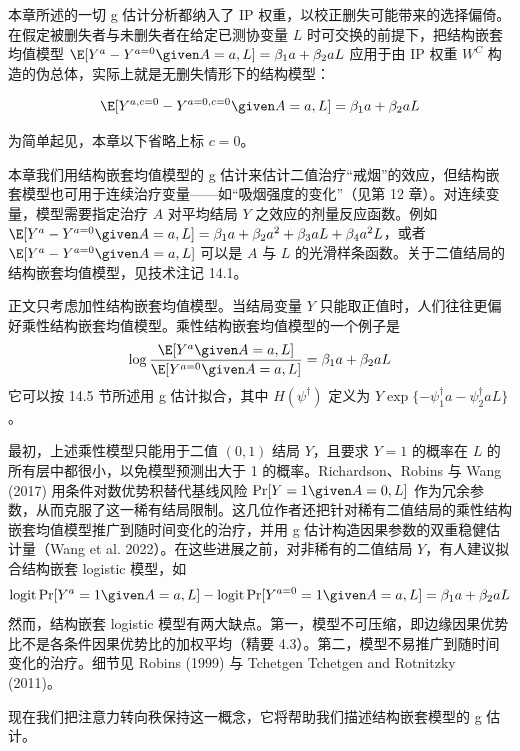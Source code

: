 本章所述的一切 g 估计分析都纳入了 IP 权重，以校正删失可能带来的选择偏倚。在假定被删失者与未删失者在给定已测协变量 $L$ 时可交换的前提下，把结构嵌套均值模型 $\E[Y^a-Y^{a=0}\given A=a,L]=\beta_1a+\beta_2aL$ 应用于由 IP 权重 $W^C$ 构造的伪总体，实际上就是无删失情形下的结构模型：

\[
\E[Y^{a,c=0}-Y^{a=0,c=0}\given A=a,L]=\beta_1a+\beta_2aL
\]


为简单起见，本章以下省略上标 $c=0$。

本章我们用结构嵌套均值模型的 g 估计来估计二值治疗“戒烟”的效应，但结构嵌套模型也可用于连续治疗变量——如“吸烟强度的变化”（见第 12 章）。对连续变量，模型需要指定治疗 $A$ 对平均结局 $Y$ 之效应的剂量反应函数。例如 $\E[Y^a-Y^{a=0}\given A=a,L]=\beta_1a+\beta_2a^2+\beta_3aL+\beta_4a^2L$，或者 $\E[Y^a-Y^{a=0}\given A=a,L]$ 可以是 $A$ 与 $L$ 的光滑样条函数。关于二值结局的结构嵌套均值模型，见技术注记 14.1。

\begin{techpoint}[乘性结构嵌套均值模型]
正文只考虑加性结构嵌套均值模型。当结局变量 $Y$ 只能取正值时，人们往往更偏好乘性结构嵌套均值模型。乘性结构嵌套均值模型的一个例子是
\[
\log\frac{\E[Y^a\given A=a,L]}{\E[Y^{a=0}\given A=a,L]}=\beta_1a+\beta_2aL
\]
它可以按 14.5 节所述用 g 估计拟合，其中 $H(\psi^\dagger)$ 定义为 $Y\exp\{-\psi_1^\dagger a-\psi_2^\dagger aL\}$。

最初，上述乘性模型只能用于二值 $(0,1)$ 结局 $Y$，且要求 $Y=1$ 的概率在 $L$ 的所有层中都很小，以免模型预测出大于 1 的概率。Richardson、Robins 与 Wang (2017) 用条件对数优势积替代基线风险 $\Pr[Y=1\given A=0,L]$ 作为冗余参数，从而克服了这一稀有结局限制。这几位作者还把针对稀有二值结局的乘性结构嵌套均值模型推广到随时间变化的治疗，并用 g 估计构造因果参数的双重稳健估计量（Wang et al. 2022）。在这些进展之前，对非稀有的二值结局 $Y$，有人建议拟合结构嵌套 logistic 模型，如
\[
\operatorname{logit}\Pr[Y^a=1\given A=a,L]-\operatorname{logit}\Pr[Y^{a=0}=1\given A=a,L]=\beta_1a+\beta_2aL
\]
然而，结构嵌套 logistic 模型有两大缺点。第一，模型不可压缩，即边缘因果优势比不是各条件因果优势比的加权平均（精要 4.3）。第二，模型不易推广到随时间变化的治疗。细节见 Robins (1999) 与 Tchetgen Tchetgen and Rotnitzky (2011)。
\end{techpoint}

现在我们把注意力转向秩保持这一概念，它将帮助我们描述结构嵌套模型的 g 估计。

